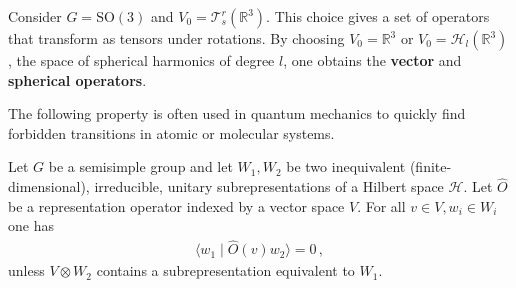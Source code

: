    \begin{example}
        Consider $G=\mathrm{SO}(3)$ and $V_0=\mathcal{T}^r_s(\mathbb{R}^3)$. This choice gives a set of operators that transform as tensors under rotations. By choosing $V_0=\mathbb{R}^3$ or $V_0=\mathcal{H}_l(\mathbb{R}^3)$, the space of spherical harmonics of degree $l$, one obtains the \textbf{vector} and \textbf{spherical operators}.
    \end{example}

    The following property is often used in quantum mechanics to quickly find forbidden transitions in atomic or molecular systems.
    \begin{property}
        Let $G$ be a semisimple group and let $W_1,W_2$ be two inequivalent (finite-dimensional), irreducible, unitary subrepresentations of a Hilbert space $\mathcal{H}$. Let $\widehat{O}$ be a representation operator indexed by a vector space $V$. For all $v\in V,w_i\in W_i$ one has
        \begin{gather}
            \langle w_1\mid\widehat{O}(v)w_2 \rangle=0\,,
        \end{gather}
        unless $V\otimes W_2$ contains a subrepresentation equivalent to $W_1$.
    \end{property}

